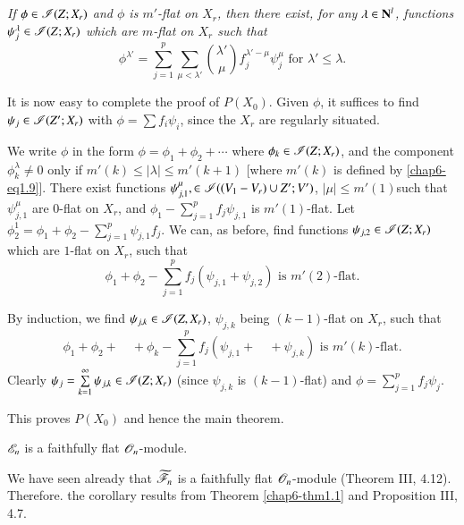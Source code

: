 \setcounter{subsection}{9}
\subsection{}\label{chap6-sec1.10}
{\em If $\phi\in \mathscr{I}(Z;X_{r})$ and $\phi$ is $m'$-flat on $X_{r}$, then there exist, for any $\lambda\in \mathbf{N}^{l}$, functions $\psi^{\lambda}_{j}\in \mathscr{I}(Z;X_{r})$ which are $m$-flat on $X_{r}$ such that}
\setcounter{equation}{10}
\begin{equation}
\phi^{\lambda'}=\sum\limits^{p}_{j=1}\sum\limits_{\mu<\lambda'}\binom{\lambda'}{\mu}f^{\lambda'-\mu}_{j}\psi^{\mu}_{j}\text{ for } \lambda'\leq \lambda.\label{chap6-eq1.11}
\end{equation}

It is now easy to complete the proof of $P(X_{0})$. Given $\phi$, it suffices to find $\psi_{j}\in \mathscr{I}(Z';X_{r})$ with $\phi=\sum f_{i}\psi_{i}$, since the $X_{r}$ are regularly situated.

We write $\phi$ in the form $\phi=\phi_{1}+\phi_{2}+\cdots$ where $\phi_{k}\in \mathscr{I}(Z;X_{r})$, and the component $\phi^{\lambda}_{k}\neq 0$ only if $m'(k)\leq |\lambda|\leq m'(k+1)$ [where $m'(k)$ is defined by \eqref{chap6-eq1.9}]. There exist functions $\psi^{\mu}_{j,1},\in \mathscr{I}((V_{1}-V_{r})\cup Z';V')$, $|\mu|\leq m'(1)$\pageoriginale such that $\psi^{\mu}_{j,1}$ are $0$-flat on $X_{r}$, and $\phi_{1}-\sum\limits^{p}_{j=1}f_{j}\psi_{j,1}$ is $m'(1)$-flat. Let $\phi^{1}_{2}=\phi_{1}+\phi_{2}-\sum\limits^{p}_{j=1}\psi_{j,1}f_{j}$. We can, as before, find functions $\psi_{j,2}\in \mathscr{I}(Z;X_{r})$ which are $1$-flat on $X_{r}$, such that
$$
\phi_{1}+\phi_{2}-\sum\limits^{p}_{j=1}f_{j}(\psi_{j,1}+\psi_{j,2})\text{ is } m'(2)\text{-flat.}
$$

By induction, we find $\psi_{j,k}\in \mathscr{I}(Z,X_{r})$, $\psi_{j,k}$ being $(k-1)$-flat on $X_{r}$, such that
$$
\phi_{1}+\phi_{2}+\quad+\phi_{k}-\sum\limits^{p}_{j=1}f_{j}(\psi_{j,1}+\quad+\psi_{j,k})\text{ is } m'(k)\text{-flat.}
$$
Clearly $\psi_{j}=\sum\limits^{\infty}_{k=1}\psi_{j,k}\in\mathscr{I}(Z;X_{r})$ (since $\psi_{j,k}$ is $(k-1)$-flat) and $\phi=\sum\limits^{p}_{j=1}f_{j}\psi_{j}$.

This proves $P(X_{0})$ and hence the main theorem.
\setcounter{theorem}{11}
\begin{corollary}\label{chap6-coro1.12}
$\mathscr{E}_{n}$ is a faithfully flat $\mathscr{O}_{n}$-module.
\end{corollary}

We have seen already that $\widetilde{\mathscr{F}}_{n}$ is a faithfully flat $\mathscr{O}_{n}$-module (Theorem III, 4.12). Therefore. the corollary results from Theorem \ref{chap6-thm1.1} and Proposition III, 4.7.

